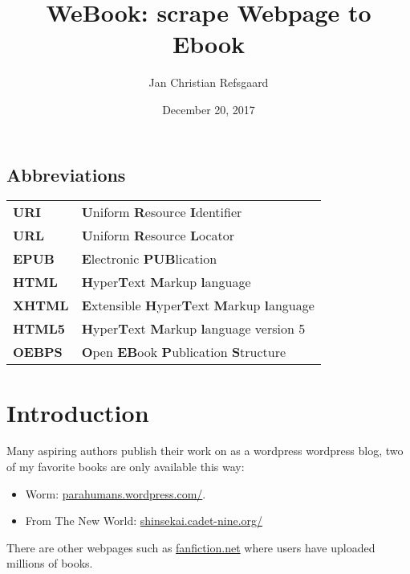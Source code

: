 \documentclass[]{report}   %
\begin{document}
\sloppy

					
\lstset{language=Python,upquote=true}
\setlength\parindent{0pt}

\title{WeBook: scrape Webpage to Ebook}
\author{Jan Christian Refsgaard}
\date{December 20, 2017}    %
\maketitle

\section*{Abbreviations}
\begin{tabular}{ l l }
	\textbf{URI}   & \textbf{U}niform \textbf{R}esource \textbf{I}dentifier \\
	\textbf{URL}   & \textbf{U}niform \textbf{R}esource \textbf{L}ocator \\
	\textbf{EPUB}  & \textbf{E}lectronic \textbf{PUB}lication  \\
	\textbf{HTML}  & \textbf{H}yper\textbf{T}ext \textbf{M}arkup \textbf{l}anguage \\
	\textbf{XHTML} & \textbf{E}xtensible \textbf{H}yper\textbf{T}ext 
					 \textbf{M}arkup \textbf{l}anguage \\
	\textbf{HTML5} & \textbf{H}yper\textbf{T}ext \textbf{M}arkup \textbf{l}anguage 
					 version 5 \\
	\textbf{OEBPS} & \textbf{O}pen \textbf{EB}ook \textbf{P}ublication \textbf{S}tructure \\
\end{tabular}

\chapter{Introduction}           
Many aspiring authors publish their work on as a wordpress wordpress blog, two
of my favorite books are only available this way:
\begin{itemize}
    \item Worm: \url{parahumans.wordpress.com/}.
    \item From The New World: \url{shinsekai.cadet-nine.org/} 
\end{itemize}
There are other webpages such as \url{fanfiction.net} where users have uploaded millions of books.
\end{document}
